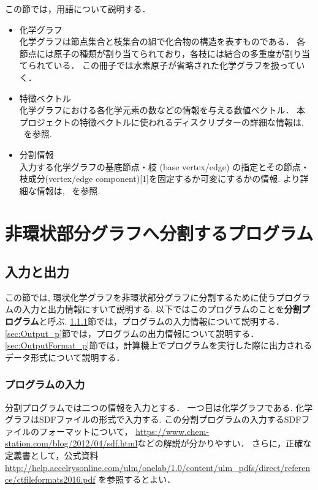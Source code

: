 \documentclass[11pt,titlepage,dvipdfmx,twoside]{jarticle}
\begin{document}
この節では，用語について説明する．
\begin{itemize}

\item 化学グラフ\\
	化学グラフは節点集合と枝集合の組で化合物の構造を表すものである．
	各節点には原子の種類が割り当てられており，各枝には結合の多重度が割り当てられている．
	この冊子では水素原子が省略された化学グラフを扱っていく．


\item 特徴ベクトル\\
化学グラフにおける各化学元素の数などの情報を与える数値ベクトル．
本プロジェクトの特徴ベクトルに使われるディスクリプターの詳細な情報は, ~\cite{branch}を参照.


\item 分割情報\\
入力する化学グラフの基底節点・枝 (base vertex/edge) の指定とその節点・枝成分(vertex/edge component)[1]を固定するか可変にするかの情報.
より詳細な情報は, ~\cite{branch}を参照.


\end{itemize}

\section{非環状部分グラフへ分割するプログラム}
\label{sec: partition}

\subsection{入力と出力}
\label{sec:InOut_p}

この節では, 環状化学グラフを非環状部分グラフに分割するために使うプログラムの入力と出力情報にすいて説明する.
以下ではこのプログラムのことを{\bf 分割プログラム}と呼ぶ.
\ref{sec:Input_p}節では，プログラムの入力情報について説明する．
\ref{sec:Output_p}節では，プログラムの出力情報について説明する．
\ref{sec:OutputFormat_p}節では，計算機上でプログラムを実行した際に出力されるデータ形式について説明する．

\subsubsection{プログラムの入力}
\label{sec:Input_p}

分割プログラムでは二つの情報を入力とする．
一つ目は化学グラフである.
化学グラフはSDFファイルの形式で入力する.
この分割プログラムの入力するSDFファイルのフォーマットについて，
\url{https://www.chem-station.com/blog/2012/04/sdf.html}などの解説が分かりやすい．
さらに，正確な定義書として，公式資料 \url{http://help.accelrysonline.com/ulm/onelab/1.0/content/ulm_pdfs/direct/reference/ctfileformats2016.pdf} を参照するとよい．
\end{document}
